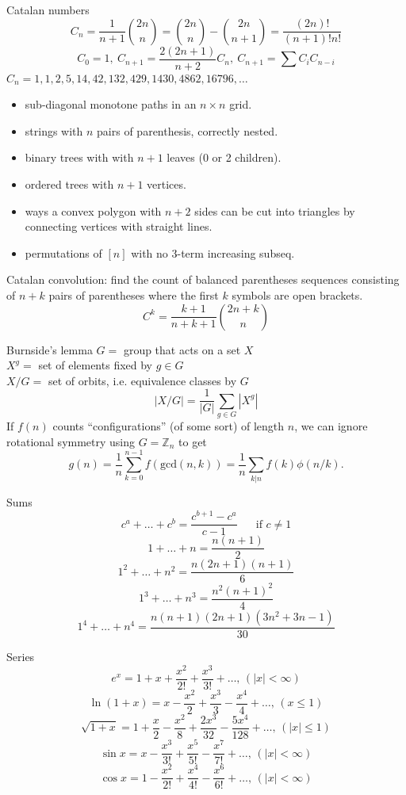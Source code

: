 \begin{misc}{Catalan numbers}
	\[ C_n=\frac{1}{n+1}\binom{2n}{n}= \binom{2n}{n}-\binom{2n}{n+1} = \frac{(2n)!}{(n+1)!n!} \]
	\[ C_0=1,\ C_{n+1} = \frac{2(2n+1)}{n+2}C_n,\ C_{n+1}=\sum C_iC_{n-i} \]
	${C_n = 1, 1, 2, 5, 14, 42, 132, 429, 1430, 4862, 16796, \dots}$
	\begin{itemize}[noitemsep,leftmargin=*]
		\item sub-diagonal monotone paths in an $n\times n$ grid.
		\item strings with $n$ pairs of parenthesis, correctly nested.
		\item binary trees with with $n+1$ leaves (0 or 2 children).
		\item ordered trees with $n+1$ vertices.
		\item ways a convex polygon with $n+2$ sides can be cut into triangles by connecting vertices with straight lines.
		\item permutations of $[n]$ with no 3-term increasing subseq.
	\end{itemize}
	Catalan convolution: find the count of balanced parentheses sequences consisting of $n+k$ pairs of parentheses where the first $k$ symbols are open brackets.
	\[ C^k=\frac{k+1}{n+k+1}\binom{2n+k}{n}\]
\end{misc}

\begin{misc}{Burnside's lemma}
	$G =$ group that acts on a set $X$ \\
	$X^g =$ set of elements fixed by $g \in G$ \\
	$X/G =$ set of orbits, i.e. equivalence classes by $G$
	$$|X/G| = \frac{1}{|G|} \sum_{g \in G} |X^g|$$
	If $f(n)$ counts ``configurations'' (of some sort) of length $n$, we can ignore rotational symmetry using $G = \mathbb Z_n$ to get
	$$g(n) = \frac 1 n \sum_{k=0}^{n-1}{f(\text{gcd}(n, k))} = \frac 1 n \sum_{k|n}{f(k)\phi(n/k)}.$$
\end{misc}

\begin{misc}{Sums}
	$$c^a + \ldots + c^b = \frac{c^{b+1} - c^a}{c-1} \text{~~~~~if } c \neq 1$$
	$$1 + \ldots + n = \frac{n(n+1)}{2}$$
	$$1^2 + \ldots + n^2 = \frac{n(2n+1)(n+1)}{6}$$
	$$1^3 + \ldots + n^3 = \frac{n^2(n+1)^2}{4}$$
	$$1^4 + \ldots + n^4 = \frac{n(n+1)(2n+1)(3n^2+3n-1)}{30}$$
\end{misc}

\begin{misc}{Series}
	$$e^x = 1+x+\frac{x^2}{2!}+\frac{x^3}{3!}+\dots,\,(|x|<\infty)$$
	$$\ln(1+x) = x-\frac{x^2}{2}+\frac{x^3}{3}-\frac{x^4}{4}+\dots,\,(x\leq1)$$
	$$\sqrt{1+x} = 1+\frac{x}{2}-\frac{x^2}{8}+\frac{2x^3}{32}-\frac{5x^4}{128}+\dots,\,(|x|\leq1)$$
	$$\sin x = x-\frac{x^3}{3!}+\frac{x^5}{5!}-\frac{x^7}{7!}+\dots,\,(|x|<\infty)$$
	$$\cos x = 1-\frac{x^2}{2!}+\frac{x^4}{4!}-\frac{x^6}{6!}+\dots,\,(|x|<\infty)$$
\end{misc}

